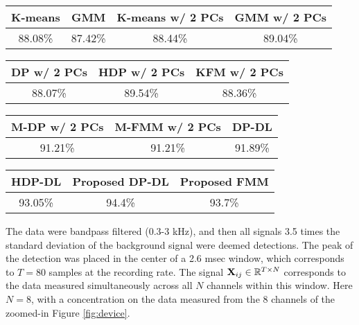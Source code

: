 \documentclass[journal]{IEEEtran}
\begin{document}
\begin{table}[t]
\begin{center}
\begin{tabular}{|c|c|c|c|}
\hline K-means & GMM & K-means w/ 2 PCs & GMM w/ 2 PCs   \\
\hline
88.08\% & 87.42\% &  88.44\% & 89.04\%   \\
\hline
\end{tabular}
\begin{tabular}{|c|c|c|}
\hline  DP w/ 2 PCs & HDP w/ 2 PCs & KFM w/ 2 PCs    \\
\hline
     88.07\% & 89.54\% & 88.36\% \\
\hline
\end{tabular}
\begin{tabular}{|c|c|c|}
\hline  M-DP w/ 2 PCs &  M-FMM w/ 2 PCs & DP-DL    \\
\hline
      91.21\%  & 91.21\% & 91.89\% \\
\hline
\end{tabular}
\begin{tabular}{|c|c|c|}
\hline  HDP-DL &  Proposed DP-DL &  Proposed FMM\\
\hline
  93.05\% & 94.4\%  & 93.7\%\\
\hline
\end{tabular}\end{center}
\end{table}



The data were bandpass filtered (0.3-3 kHz), and
then all signals 3.5 times the standard deviation of the background
signal were deemed detections. The peak of the detection was placed
in the center of a 2.6 msec window, which corresponds to $T=80$
samples at the recording rate. The signal
${\mathbf X}_{ij}\in\mathbb{R}^{T\times N}$ corresponds to the data
measured simultaneously across all $N$ channels within this window.
Here $N=8$, with a concentration on the data measured from the 8
channels of the zoomed-in Figure \ref{fig:device}.

\end{document}
